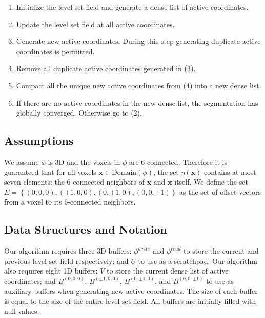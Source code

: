 \documentclass{egpubl}
\newcommand{\leftbracket}{\left(}
\newcommand{\rightbracket}{\right)}
\newcommand{\leftcbracket}{\left\{}
\newcommand{\rightcbracket}{\right\}}
\newcommand{\boldx}{{\mathbf x}}
\newcommand{\nx}{ \eta \leftbracket \boldx \rightbracket }
\newcommand{\phiread}{ \phi^{read} }
\newcommand{\phiwrite}{ \phi^{write} }
\newcommand{\domainphi}{ \mbox{Domain} \leftbracket \phi \rightbracket }
\begin{document}
\begin{enumerate}

    \item Initialize the level set field and generate a dense list of active coordinates.

    \item Update the level set field at all active coordinates.

    \item Generate new active coordinates. During this step generating duplicate active coordinates is permitted.

    \item Remove all duplicate active coordinates generated in (3).

    \item Compact all the unique new active coordinates from (4) into a new dense list.

    \item If there are no active coordinates in the new dense list, the segmentation has globally converged. Otherwise go to (2).

\end{enumerate}


\subsection{Assumptions}
\label{subsec:assumptions}

We assume $ \phi $ is 3D and the voxels in $ \phi $ are 6-connected. Therefore it is guaranteed that for all voxels $ \boldx \in \domainphi $, the set $ \nx $ contains at most seven elements: the 6-connected neighbors of $ \boldx $ and $ \boldx $ itself. We define the set $ E = \leftcbracket \leftbracket 0,0,0 \rightbracket , \leftbracket \pm 1,0,0 \rightbracket , \leftbracket 0,\pm 1,0 \rightbracket , \leftbracket 0,0,\pm 1 \rightbracket \rightcbracket $ as the set of offset vectors from a voxel to its 6-connected neighbors.


\subsection{Data Structures and Notation}
\label{subsec:dataStructuresAndNotation}

Our algorithm requires three 3D buffers: $\phiwrite$ and $\phiread$ to store the current and previous level set field respectively; and $U$ to use as a scratchpad. Our algorithm also requires eight 1D buffers: $V$ to store the current dense list of active coordinates; and $B^{ \leftbracket 0,0,0 \rightbracket }$, $B^{ \leftbracket \pm 1,0,0 \rightbracket }$, $B^{ \leftbracket 0, \pm 1,0 \rightbracket }$, and $B^{ \leftbracket 0,0, \pm 1 \rightbracket }$ to use as auxiliary buffers when generating new active coordinates. The size of each buffer is equal to the size of the entire level set field. All buffers are initially filled with null values.
\end{document}
